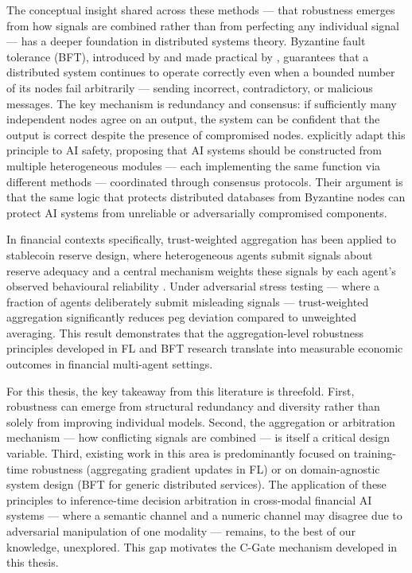 The conceptual insight shared across these methods --- that robustness emerges from how signals are combined rather than from perfecting any individual signal --- has a deeper foundation in distributed systems theory. Byzantine fault tolerance (BFT), introduced by \cite{lamport1982byzantine} and made practical by \cite{castro1999pbft}, guarantees that a distributed system continues to operate correctly even when a bounded number of its nodes fail arbitrarily --- sending incorrect, contradictory, or malicious messages. The key mechanism is redundancy and consensus: if sufficiently many independent nodes agree on an output, the system can be confident that the output is correct despite the presence of compromised nodes. \cite{devadoss_byzantine_2025} explicitly adapt this principle to AI safety, proposing that AI systems should be constructed from multiple heterogeneous modules --- each implementing the same function via different methods --- coordinated through consensus protocols. Their argument is that the same logic that protects distributed databases from Byzantine nodes can protect AI systems from unreliable or adversarially compromised components.

In financial contexts specifically, trust-weighted aggregation has been applied to stablecoin reserve design, where heterogeneous agents submit signals about reserve adequacy and a central mechanism weights these signals by each agent's observed behavioural reliability \cite{you_stablecoin_2026}. Under adversarial stress testing --- where a fraction of agents deliberately submit misleading signals --- trust-weighted aggregation significantly reduces peg deviation compared to unweighted averaging. This result demonstrates that the aggregation-level robustness principles developed in FL and BFT research translate into measurable economic outcomes in financial multi-agent settings.

For this thesis, the key takeaway from this literature is threefold. First, robustness can emerge from structural redundancy and diversity rather than solely from improving individual models. Second, the aggregation or arbitration mechanism --- how conflicting signals are combined --- is itself a critical design variable. Third, existing work in this area is predominantly focused on training-time robustness (aggregating gradient updates in FL) or on domain-agnostic system design (BFT for generic distributed services). The application of these principles to inference-time decision arbitration in cross-modal financial AI systems --- where a semantic channel and a numeric channel may disagree due to adversarial manipulation of one modality --- remains, to the best of our knowledge, unexplored. This gap motivates the C-Gate mechanism developed in this thesis.

